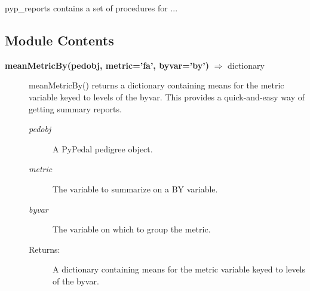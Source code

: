 pyp\_reports contains a set of procedures for ...

\subsection*{Module Contents}
\begin{description}
\item[\textbf{meanMetricBy(pedobj, metric='fa', byvar='by')} $\Rightarrow$ dictionary]
meanMetricBy() returns a dictionary containing means for the metric variable keyed to levels of the byvar.  This provides a quick-and-easy way of getting summary reports.
\begin{description}
\item[\emph{pedobj}] A PyPedal pedigree object.
\item[\emph{metric}] The variable to summarize on a BY variable.
\item[\emph{byvar}] The variable on which to group the metric.
\item[Returns:] A dictionary containing means for the metric variable keyed to levels of the byvar.
\end{description}

\end{description}